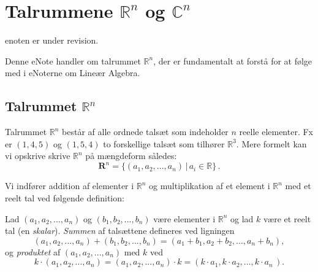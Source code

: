 
\setcounter{chapter}{0} %

\chapter{Talrummene $\mathbb R^n $ og $\mathbb C^n $} \label{tn1}

enoten er under revision.

 

\begin{basis}
Denne eNote handler om talrummet $\mathbb R^n $, der er fundamentalt at forstå for at følge med i eNoterne om Lineær Algebra.
\end{basis}

\section{Talrummet $\mathbb R^n $}

Talrummet $\mathbb R ^n$ består af alle ordnede talsæt som indeholder $n$ reelle elementer. Fx er $(1,4,5)$ og $(1,5,4)$ to forskellige talsæt som tilhører $\mathbb R ^3$. Mere formelt kan vi opskrive skrive $\mathbb R ^n$ på mængdeform således:
\begin{equation}\label{eqRn}
\mathbf R ^n=\{(a_1,a_2,...,a_n)\,|\,a_i \in \mathbb R\}\,.
\end{equation}

Vi indfører addition af elementer i $\mathbb R ^n$ og multiplikation af et element i $\mathbb R ^n$ med et reelt tal ved følgende definition:

\begin{definition}\label{tn1.defRegneOP}
Lad $(a_1,a_2,...,a_n)$ og $(b_1,b_2,...,b_n)$ være elementer i $\mathbb R ^n$ og lad $k$ være et reelt tal (en \emph{skalar}).
\textit{Summen} af talsættene defineres ved ligningen
\begin{equation}\label{eqRnSum}
(a_1,a_2,...,a_n)+(b_1,b_2,...,b_n)=(a_1+b_1,a_2+b_2,...,a_n+b_n),
\end{equation}
og \textit{produktet} af $(a_1,a_2,...,a_n)$ med $k$ ved
\begin{equation}\label{eqRnMult}
k\cdot(a_1,a_2,...,a_n)=(a_1,a_2,...,a_n)\cdot k=(k\cdot a_1,k\cdot a_2,...,k\cdot a_n\,).
\end{equation}
\end{definition}

